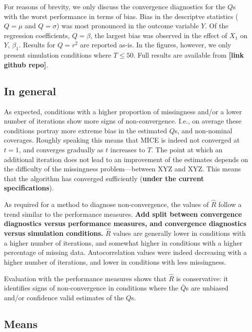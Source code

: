 \documentclass[Royal,times,sageh]{sagej}
\begin{document}
For reasons of brevity, we only discuss the convergence diagnostics for
the \(Q\)s with the worst performance in terms of bias. Bias in the
descriptve statistics (\(Q=\mu\) and \(Q=\sigma\)) was most pronounced
in the outcome variable \(Y\). Of the regression coefficients,
\(Q=\beta\), the largest bias was observed in the effect of \(X_1\) on
\(Y\), \(\beta_1\). Results for \(Q=r^2\) are reported as-is. In the
figures, however, we only present simulation conditions where
\(T\leq50\). Full results are available from \textbf{{[}link github
repo{]}}.

\hypertarget{in-general}{%
\subsection{In general}\label{in-general}}

As expected, conditions with a higher proportion of missingness and/or a
lower number of iterations show more signs of non-convergence. I.e., on
average these conditions portray more extreme bias in the estimated
\(Q\)s, and non-nominal coverages. Roughly speaking this means that MICE
is indeed not converged at \(t=1\), and converges gradually as \(t\)
increases to \(T\). The point at which an additional iteration does not
lead to an improvement of the estimates depends on the difficulty of the
missingness problem---between XYZ and XYZ. This means that the algorithm
has converged sufficiently (\textbf{under the current specifications}).

As required for a method to diagnose non-convergence, the values of
\(\widehat{R}\) follow a trend similar to the performance measures.
\textbf{Add split between convergence diagnostics versus performance
measures, and convergence diagnostics versus simulation conditions.}
\(\widehat{R}\) values are generally lower in conditions with a higher
number of iterations, and somewhat higher in conditions with a higher
percentage of missing data. Autocorrelation values were indeed
decreasing with a higher number of iterations, and lower in conditions
with less missingness.

Evaluation with the performance measures shows that \(\widehat{R}\) is
conservative: it identifies signs of non-convergence in conditions where
the \(\bar{Q}\)s are unbiased and/or confidence valid estimates of the
\(Q\)s.

\hypertarget{means}{%
\subsection{Means}\label{means}}
\end{document}
